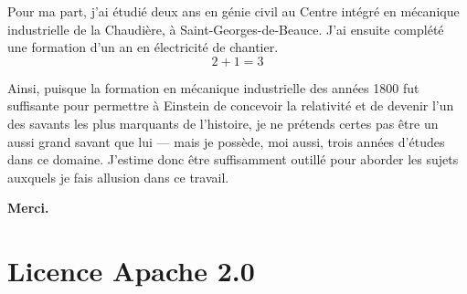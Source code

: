 \documentclass[12pt,oneside]{article}
\begin{document}
Pour ma part, j'ai étudié deux ans en génie civil au Centre intégré en mécanique industrielle de la Chaudière, à Saint-Georges-de-Beauce. J'ai ensuite complété une formation d'un an en électricité de chantier.  
\[
2 + 1 = 3
\]

Ainsi, puisque la formation en mécanique industrielle des années 1800 fut suffisante pour permettre à Einstein de concevoir la relativité et de devenir l'un des savants les plus marquants de l'histoire, je ne prétends certes pas être un aussi grand savant que lui --- mais je possède, moi aussi, trois années d'études dans ce domaine. J'estime donc être suffisamment outillé pour aborder les sujets auxquels je fais allusion dans ce travail.

\bigskip

\begin{center}
\textbf{Merci.}
\end{center}


\appendix
\section*{Licence Apache 2.0}
\end{document}
